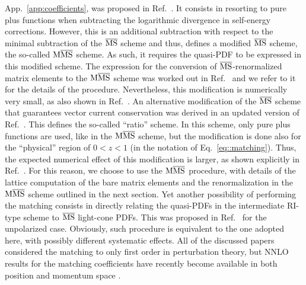 App.~\ref{app:coefficients}, was proposed in Ref.~\cite{Alexandrou:2018pbm}. It
consists in resorting to pure plus functions when subtracting the logarithmic
divergence in self-energy corrections. However, this is an additional
subtraction with respect to the minimal subtraction of the $\overline{\mathrm{MS}}$ scheme and
thus, defines a modified $\overline{\mathrm{MS}}$ scheme, the so-called ${\rm M}\overline{\mathrm{MS}}$ scheme. As such,
it requires the quasi-PDF to be expressed in this modified scheme. The
expression for the conversion of $\overline{\mathrm{MS}}$-renormalized matrix elements to the
${\rm M}\overline{\mathrm{MS}}$ scheme was worked out in Ref.~\cite{Alexandrou:2019lfo} and we refer to
it for the details of the procedure. Nevertheless, this modification is
numerically very small, as also shown in Ref.~\cite{Alexandrou:2019lfo}. An
alternative modification of the $\overline{\mathrm{MS}}$ scheme that guarantees vector current
conservation was derived in an updated version of Ref.~\cite{Izubuchi:2018srq}.
This defines the so-called ``ratio'' scheme. In this scheme, only pure plus
functions are used, like in the ${\rm M}\overline{\mathrm{MS}}$ scheme, but the modification is done
also for the ``physical'' region of $0<z<1$ (in the notation of
Eq.~\eqref{eq::matching}). Thus, the expected numerical effect of this
modification is larger, as shown explicitly in Ref.~\cite{Alexandrou:2019lfo}.
For this reason, we choose to use the ${\rm M}\overline{\mathrm{MS}}$ procedure, with details of the
lattice computation of the bare matrix elements and the renormalization in the
${\rm M}\overline{\mathrm{MS}}$ scheme outlined in the next section. Yet another possibility of
performing the matching consists in directly relating the quasi-PDFs in the
intermediate RI-type scheme to $\overline{\mathrm{MS}}$ light-cone PDFs. This was proposed in
Ref.~\cite{Stewart:2017tvs} for the unpolarized case. Obviously, such
procedure is equivalent to the one adopted here, with possibly different
systematic effects. All of the discussed papers considered the matching to only
first order in perturbation theory, but NNLO results for the matching coefficients have recently become available
in both position and momentum space \cite{Li:2020xml, Chen:2020ody, Braun:2020ymy, Chen:2020arf, Chen:2020iqi}.

